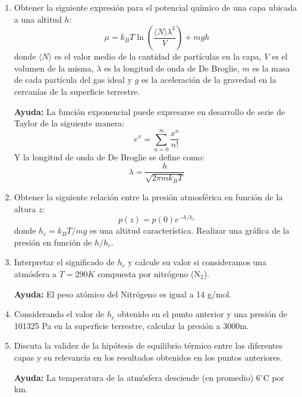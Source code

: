 \documentclass[a4paper,11pt]{article}
\begin{document}
\begin{enumerate}[label=(\alph*),
                  leftmargin=2\parindent,
                  rightmargin=2\parindent]

    \item{Obtener la siguiente expresión para el potencial químico de 
          una capa ubicada a una altitud $h$:
          $$ \mu =
          k_B T \ln \left( \frac{\langle N \rangle \lambda^3}{V} \right)
          + mgh $$
          donde $\langle N \rangle$ es el valor medio de la cantidad de 
          partículas en la capa, $V$ es el volumen de la misma, 
          $\lambda$ es la longitud de onda de De Broglie, $m$ es la 
          masa de cada partícula del gas ideal y $g$ es la aceleración 
          de la gravedad en la cercanías de la superficie terrestre.
          }

    {\small
    \textbf{Ayuda:}
    La función exponencial puede expresarse en desarrollo de serie de 
    Taylor de la siguiente manera:
    $$ e^x = \sum_{n=0}^\infty \frac{x^n}{n!} $$
    Y la longitud de onda de De Broglie se define como:
    $$ \lambda = \frac{h}{\sqrt{2\pi m k_B T}} $$
    }

    \item{Obtener la siguiente relación entre la presión atmosférica 
          en función de la altura $z$:
          $$ p(z) = p(0) e^{-h/h_c} $$
          donde $h_c = k_B T / mg$ es una altitud característica.
          Realizar una gráfica de la presión en función de $h/h_c$.
          }
    
    \item{Interpretar el significado de $h_c$ y calcule su valor si 
          consideramos una atmósfera a $T = 290 K$ compuesta por 
          nitrógeno (N$_2$).}

    {\small
    \textbf{Ayuda:}
    El peso atómico del Nitrógeno es igual a 14 g/mol.
    }

    \item{Considerando el valor de $h_c$ obtenido en el punto anterior 
          y una presión de 101325 Pa en la superficie terrestre,
          calcular la presión a 3000m.}

    \item{Discuta la validez de la hipótesis de equilibrio térmico 
          entre las diferentes capas y su relevancia en los resultados 
          obtenidos en los puntos anteriores.}
    
    {\small
    \textbf{Ayuda:}
    La temperatura de la atmósfera desciende (en promedio) 6$^\circ$C 
    por km.
    }

\end{enumerate}
\end{document}
